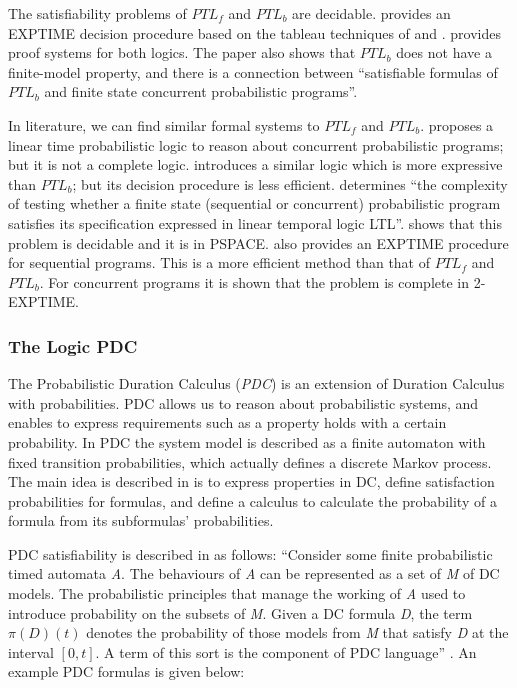 \documentclass[11pt]{article}
\begin{document}
The satisfiability problems of $PTL_{f}$  and $PTL_{b}$ are decidable. \cite{HS84} provides an EXPTIME decision procedure based on the tableau techniques of \cite{BMP81} and \cite{CE82}. \cite{HS84}  provides proof systems for both logics. The paper also shows that $PTL_{b}$ does not have a finite-model property, and there is a connection between ``satisfiable formulas of $PTL_{b}$ and finite state concurrent probabilistic programs''.

In literature, we can find similar formal systems to $PTL_{f}$  and $PTL_{b}$. \cite{Pnu83} proposes a linear time probabilistic logic to reason about concurrent probabilistic programs; but it is not a complete logic.  \cite{LS83} introduces a similar logic which is more expressive than $PTL_{b}$; but its decision procedure is less efficient. \cite{CY88} determines ``the complexity of testing whether a finite state (sequential or concurrent) probabilistic program satisfies its specification expressed in linear temporal logic LTL''. \cite{CY88} shows that this problem is decidable and it is in PSPACE. \cite{CY88} also provides an EXPTIME procedure for sequential programs. This is a more efficient method than that of $PTL_{f}$ and $PTL_{b}$. For concurrent programs it is shown that the problem is complete in 2-EXPTIME.

\subsubsection{The Logic PDC}

The Probabilistic Duration Calculus (\textit{PDC})  \cite{LRSZ92} is an extension of Duration Calculus \cite{CHR91} with probabilities. PDC allows us to reason about probabilistic systems, and enables to express requirements such as a property holds with a certain probability. In PDC the system model is described as a finite automaton with fixed transition probabilities, which actually defines a discrete Markov process. The main idea is described in \cite{LRSZ92} is to express properties in DC, define satisfaction probabilities for formulas, and define a calculus to calculate the probability of a formula from its  subformulas' probabilities.  

PDC satisfiability is described in \cite{LRSZ92} as follows: ``Consider some finite probabilistic timed automata \textit{A}. The behaviours of \textit{A} can be represented as a set of \textit{M} of DC models. The probabilistic principles that manage the working of \textit{A} used to introduce probability on the subsets of \textit{M}. Given a DC formula \textit{D}, the term $\pi(D)(t)$ denotes the probability of those models from \textit{M} that satisfy \textit{D} at the interval $[0,t]$. A term of this sort is the component of PDC language'' \cite{LRSZ92}. An example PDC formulas is given below:
\end{document}
